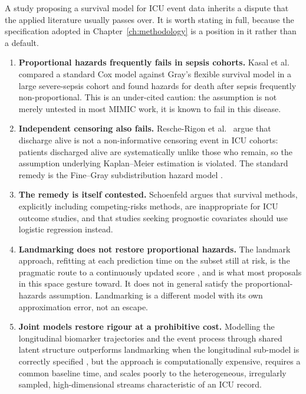 A study proposing a survival model for ICU event data inherits a dispute that
the applied literature usually passes over. It is worth stating in full,
because the specification adopted in Chapter~\ref{ch:methodology} is a position
in it rather than a default.

\begin{enumerate}
    \item \textbf{Proportional hazards frequently fails in sepsis cohorts.}
    Kasal et al.\ \cite{kasal2004cox} compared a standard Cox model against
    Gray's flexible survival model in a large severe-sepsis cohort and found
    hazards for death after sepsis frequently non-proportional. This is an
    under-cited caution: the assumption is not merely untested in most MIMIC
    work, it is known to fail in this disease.

    \item \textbf{Independent censoring also fails.} Resche-Rigon et al.\
    \cite{rescherigon2006competing} argue that discharge alive is not a
    non-informative censoring event in ICU cohorts: patients discharged alive
    are systematically unlike those who remain, so the assumption underlying
    Kaplan--Meier estimation is violated. The standard remedy is the Fine--Gray
    subdistribution hazard model \cite{finegray1999subdistribution}.

    \item \textbf{The remedy is itself contested.} Schoenfeld
    \cite{schoenfeld2006survival} argues that survival methods, explicitly
    including competing-risks methods, are inappropriate for ICU outcome
    studies, and that studies seeking prognostic covariates should use logistic
    regression instead.

    \item \textbf{Landmarking does not restore proportional hazards.} The
    landmark approach, refitting at each prediction time on the subset still
    at risk, is the pragmatic route to a continuously updated score
    \cite{vanhouwelingen2007landmark}, and is what most proposals in this space
    gesture toward. It does not in general satisfy the proportional-hazards
    assumption. Landmarking is a different model with its own approximation
    error, not an escape.

    \item \textbf{Joint models restore rigour at a prohibitive cost.} Modelling
    the longitudinal biomarker trajectories and the event process through shared
    latent structure outperforms landmarking when the longitudinal sub-model is
    correctly specified \cite{rizopoulos2017joint}, but the approach is
    computationally expensive, requires a common baseline time, and scales
    poorly to the heterogeneous, irregularly sampled, high-dimensional streams
    characteristic of an ICU record.
\end{enumerate}

